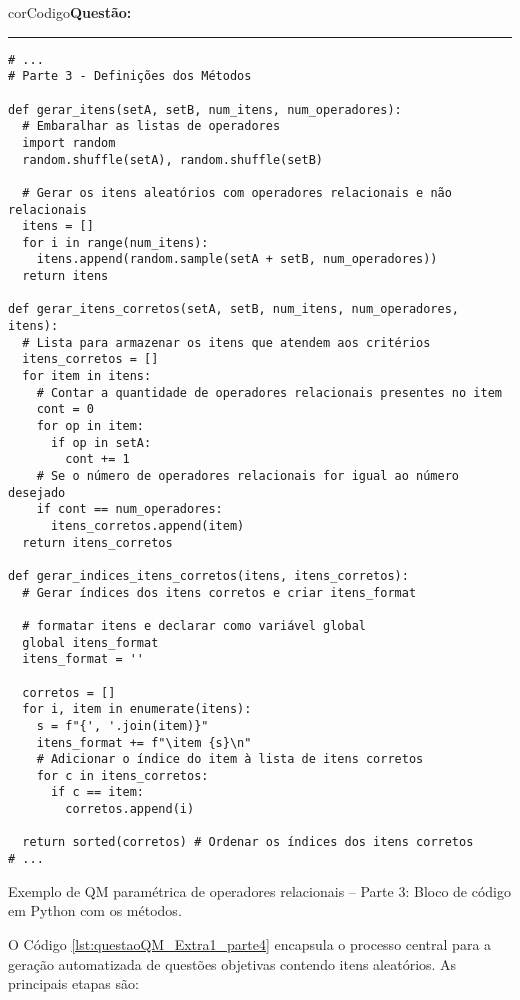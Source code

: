 \begin{listing}[!ht]
    \begin{myboxCode}{corCodigo}{\textbf{Questão: }}\vspace{3mm}
    \hrule
    \begin{verbatim}
# ...
# Parte 3 - Definições dos Métodos

def gerar_itens(setA, setB, num_itens, num_operadores):
  # Embaralhar as listas de operadores
  import random
  random.shuffle(setA), random.shuffle(setB)

  # Gerar os itens aleatórios com operadores relacionais e não relacionais
  itens = []
  for i in range(num_itens):
    itens.append(random.sample(setA + setB, num_operadores))
  return itens

def gerar_itens_corretos(setA, setB, num_itens, num_operadores, itens):
  # Lista para armazenar os itens que atendem aos critérios
  itens_corretos = []
  for item in itens:
    # Contar a quantidade de operadores relacionais presentes no item
    cont = 0
    for op in item:
      if op in setA:
        cont += 1
    # Se o número de operadores relacionais for igual ao número desejado
    if cont == num_operadores:
      itens_corretos.append(item)
  return itens_corretos

def gerar_indices_itens_corretos(itens, itens_corretos):
  # Gerar índices dos itens corretos e criar itens_format

  # formatar itens e declarar como variável global
  global itens_format
  itens_format = ''

  corretos = []
  for i, item in enumerate(itens):
    s = f"{', '.join(item)}"
    itens_format += f"\item {s}\n"
    # Adicionar o índice do item à lista de itens corretos
    for c in itens_corretos:
      if c == item:
        corretos.append(i)

  return sorted(corretos) # Ordenar os índices dos itens corretos
# ...
\end{verbatim}
\end{myboxCode}
\caption{Exemplo de QM paramétrica de operadores relacionais -- Parte 3: Bloco de código em Python com os métodos.}
\label{lst:questaoQM_Extra1_parte3}
\end{listing}

O Código \ref{lst:questaoQM_Extra1_parte4} encapsula o processo central para a geração automatizada de questões objetivas contendo itens aleatórios. As principais etapas são:

